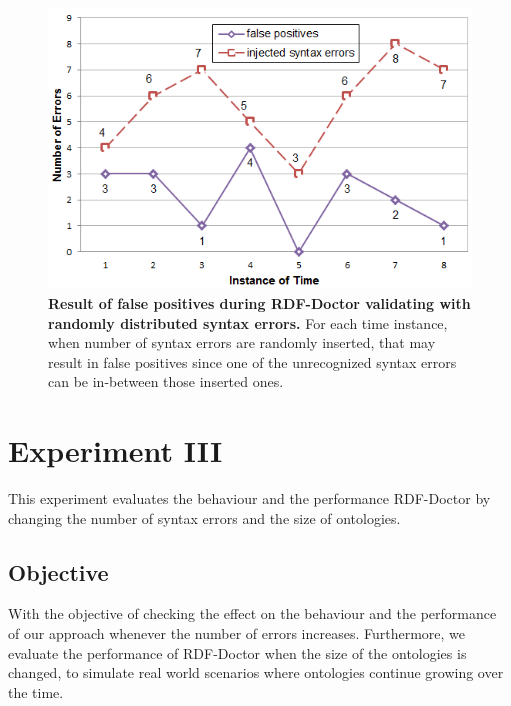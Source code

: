 
\begin{figure}[ht]
	\begin{center}
		\includegraphics[scale=0.9,angle=0]{images/Experiment02-03.png}
				\setlength\belowcaptionskip{-5mm}
		\caption{\textbf{Result of false positives during RDF-Doctor validating with randomly distributed syntax errors.} 
		For each time instance, when number of syntax errors are randomly inserted, that may result in false positives since one of the unrecognized syntax errors can be in-between those inserted ones.} 
		\label{Fig:Experiment02-03}
				\setlength\belowcaptionskip{-5mm}
		\setlength\abovecaptionskip{0mm}
	\end{center}
\end{figure}
 


\section{Experiment III}

This experiment evaluates the behaviour and the performance RDF-Doctor by changing the number of syntax errors and the size of ontologies. 

\subsection{Objective}
With the objective of checking the effect on the behaviour and the performance of our approach whenever the number of errors increases.
Furthermore, we evaluate the performance of RDF-Doctor when the size of the ontologies is changed, to simulate real world scenarios where ontologies continue growing over the time.

